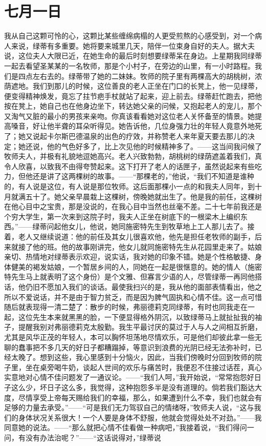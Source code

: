 \documentclass[12pt,oneside]{book}
\begin{document}
\chapter{七月一日}
我从自己这颗可怜的心，这颗比某些缠绵病榻的人更受煎熬的心感受到，对一个病人来说，绿蒂有多重要。她将要来城里几天，陪伴一位束身自好的夫人。据大夫说，这位夫人大限已近，在她生命的最后时刻想要绿蒂呆在身边。上星期我同绿蒂一起去看望圣某某的一名牧师，那是个小村子，在旁边的山里，有一小时路程。我们是四点左右去的。绿蒂带了她的二妹妹。牧师的院子里有两棵高大的胡桃树，浓荫遮地。我们到那儿的时候，这位善良的老人正坐在门口的长凳上，他一见绿蒂，便变得精神焕发，竟忘了拄节疤手杖就站了起来，迎上前去。绿蒂赶忙跑去，把他按在凳上，她自己也在他身边坐下，转达她父亲的问候，又抱起老人的宠儿，那个又淘气又脏的最小的男孩来亲吻。你真该看看她对这位老人关怀备至的情景。她提高嗓音，好让他半聋的耳朵听得见。她告诉他，几位身强力壮的年轻人竟意外地死了；她又说起卡尔斯巴德温泉的出色的疗效，并称赞老人来年夏天要去那儿的决定；她还说，他的气色好多了，比上次见他的时候精神多了。——这当间我问候了牧师夫人，并极有礼貌地逗她高兴。老人兴致勃勃，胡桃树的绿荫遮盖着我们，真令人欣喜，以致我不由得夸赞起来。这下打开了老人的话匣子，虽然说起来有些吃力，但他还是讲了这两棵树的故事。——“那棵老的，”他说，“我们不知道是谁种的，有人说是这位，有人说是那位牧师。这后面那棵小一点的和我夫人同年，到十月就满五十了。她父亲早晨栽上这棵树，傍晚她就出生了。他是我的前任，这棵树在他心目中之宝贵，那是没说的，在我心目中当然也丝毫不差。二十七年前我还是个穷大学生，第一次来到这院子时，我夫人正坐在树底下的一根梁木上编织东西。”——绿蒂问起他女儿，他说，她同施密特先生到牧草地上工人那儿去了。接着，老人又继续说道：他的前任及其女儿很喜欢他，他先是担任老牧师的副手，后来就接了他的班。他的故事刚讲完，他女儿就同施密特先生从花园里走来了。姑娘亲切、热情地对绿蒂表示欢迎，说实话，我对她的印象不错。她是个性格敏捷、身体健美的褐发姑娘，一个暂居乡间的人，同她在一起是很惬意的。她的情人（施密特先生马上就表明了这个身份）是个文雅、但寡言少语的人，尽管绿蒂一再同他搭话，他仍旧不愿加入我们的谈话。最使我扫兴的是，我从他的面部表情看出，他之所以不爱说话，并不是由于智力贫乏，而是因为脾气固执和心情不佳。这一点可惜随后就表现得一清二楚了：散步的时候，弗丽德莉克同绿蒂，有时也同我走在一起，这位先生本来就黑黑的脸，一下便显得格外阴沉，以致绿蒂马上就扯扯我的袖子，提醒我别对弗丽德莉克太殷勤。我生平最讨厌的莫过于人与人之间相互折磨，尤其是风华正茂的年轻人，本可以胸怀坦荡地尽情欢乐，可是他们却彼此拿一些无聊的蠢事把不多几天的好日子都糟蹋掉，等意识到浪费的光阴已经无法弥补时，已经太晚了。想到这些，我心里感到十分恼火，因此，当我们傍晚时分回到牧师的院子里，坐在桌旁喝牛奶，谈起人世间的欢乐与痛苦时，我便忍不住接过话茬，真心实意地对心情不佳问题发了一通议论。——“我们人呵，”我开始说，“常常抱怨好日子这么少，坏日子这么多，我觉得，这种抱怨多半是没有道理的。倘若我们豁达大度，尽情享受上帝每天赐给我们的幸福，那么，如果遭到什么不幸，我们也就会有足够的力量去承受。”——“可是我们无力驾驭自己的情绪呀，”牧师夫人说，“这与我们的身体状况关系很大！一个人要是身体不舒服，他就会觉得处处不对劲。”——我同意她的说法。——“那么就把心情不佳看做一种病吧，”我接着说，“我们得问一问，有没有办法治呢？”——“这话说得对，”绿蒂说
\end{document}
